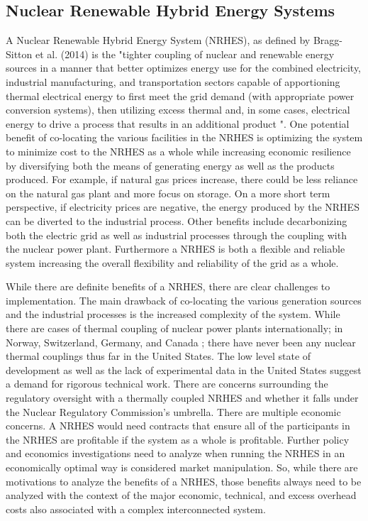 \documentclass{article}                                                                           %
\begin{document}
\begin{linenumbers}
\subsection{Nuclear Renewable Hybrid Energy Systems}

A Nuclear Renewable Hybrid Energy System (NRHES), as defined by Bragg-Sitton et al. (2014) is the "tighter coupling of nuclear and renewable energy sources in a manner that better optimizes energy use for the combined electricity, industrial manufacturing, and transportation sectors capable of apportioning thermal electrical energy to first meet the grid demand (with appropriate power conversion systems), then utilizing excess thermal and, in some cases, electrical energy to drive a process that results in an additional product \cite {Bragg-Sitton2014}".  One potential benefit of co-locating the various facilities in the NRHES is optimizing the system to minimize cost to the NRHES as a whole while increasing economic resilience by diversifying both the means of generating energy as well as the products produced. For example, if natural gas prices increase, there could be less reliance on the natural gas plant and more focus on storage.  On a more short term perspective, if electricity prices are negative, the energy produced by the NRHES can be diverted to the industrial process. Other benefits include decarbonizing both the electric grid as well as industrial processes through the coupling with the nuclear power plant. Furthermore a NRHES is both a flexible and reliable system increasing the overall flexibility and reliability of the grid as a whole.

While there are definite benefits of a NRHES, there are clear challenges to implementation. The main drawback of co-locating the various generation sources and the industrial processes is the increased complexity of the system.  While there are cases of thermal coupling of nuclear power plants internationally; in Norway, Switzerland, Germany, and Canada \cite{Verfondern};  there have never been any nuclear thermal couplings thus far in the United States.  The low level state of development as well as the lack of experimental data in the United States suggest a demand for rigorous technical work.  There are concerns surrounding the regulatory oversight with a thermally coupled NRHES and whether it falls under the Nuclear Regulatory Commission's umbrella. There are multiple economic concerns. A NRHES would need contracts that ensure all of the participants in the NRHES are profitable if the system as a whole is profitable. Further policy and economics investigations need to analyze when running the NRHES in an economically optimal way is considered market manipulation. So, while there are motivations to analyze the benefits of a NRHES, those benefits always need to be analyzed with the context of the major economic, technical, and excess overhead costs also associated with a complex interconnected system.


\end{linenumbers}
\end{document}
